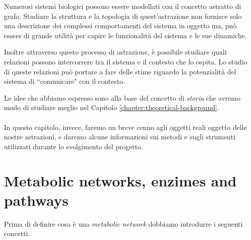 Numerosi sistemi biologici possono essere modellati con il concetto
astratto di grafo. Studiare la struttura e la topologia di
quest'astrazione non fornisce solo una descrizione dei complessi
comportamenti del sistema in oggetto ma, pu\`o essere di grande
utilit\`a per capire le funzionalit\`a del sistema e le sue dinamiche.

Inoltre attraverso questo processo di astrazione, \`e possibile
studiare quali relazioni possono intercorrere tra il sistema e il
contesto che lo ospita. Lo studio di queste relazioni pu\`o portare a
fare delle stime riguardo la potenzialit\`a del sistema di
``comunicare" con il contesto.

Le idee che abbiamo espresso sono alla base del concetto di
\emph{storia} che avremo modo di studiare meglio nel Capitolo
\ref{chapter:theoretical-background}.  
\\\\
In questo capitolo, invece, faremo un breve cenno agli oggetti reali
oggetto delle nostre astrazioni, e daremo alcune informazioni sui
metodi e sugli strumenti utilizzati durante lo svolgimento del
progetto.

\section{Metabolic networks, enzimes and pathways}

Prima di definire cosa \`e una \emph{metabolic network} dobbiamo
introdurre i seguenti concetti.

